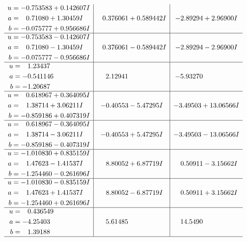 \documentclass[1p]{elsarticle_modified}
\theoremstyle{definition}
\begin{document}
$$\begin{array}{c|c|c}
\begin{aligned}
u &= -0.753583 + 0.142607 I \\
a &= \phantom{-}0.71080 + 1.30459 I \\
b &= -0.075777 + 0.956686 I\end{aligned}
 & \phantom{-}0.376061 + 0.589442 I & -2.89294 + 2.96900 I \\ \hline\begin{aligned}
u &= -0.753583 - 0.142607 I \\
a &= \phantom{-}0.71080 - 1.30459 I \\
b &= -0.075777 - 0.956686 I\end{aligned}
 & \phantom{-}0.376061 - 0.589442 I & -2.89294 - 2.96900 I \\ \hline\begin{aligned}
u &= \phantom{-}1.23437\phantom{ +0.000000I} \\
a &= -0.541146\phantom{ +0.000000I} \\
b &= -1.20687\phantom{ +0.000000I}\end{aligned}
 & \phantom{-}2.12941\phantom{ +0.000000I} & -5.93270\phantom{ +0.000000I} \\ \hline\begin{aligned}
u &= \phantom{-}0.618967 + 0.364095 I \\
a &= \phantom{-}1.38714 + 3.06211 I \\
b &= -0.859186 + 0.407319 I\end{aligned}
 & -0.40553 - 5.47295 I & -3.49503 + 13.06566 I \\ \hline\begin{aligned}
u &= \phantom{-}0.618967 - 0.364095 I \\
a &= \phantom{-}1.38714 - 3.06211 I \\
b &= -0.859186 - 0.407319 I\end{aligned}
 & -0.40553 + 5.47295 I & -3.49503 - 13.06566 I \\ \hline\begin{aligned}
u &= -1.010830 + 0.835159 I \\
a &= \phantom{-}1.47623 - 1.41537 I \\
b &= -1.254460 - 0.261696 I\end{aligned}
 & \phantom{-}8.80052 + 6.87719 I & \phantom{-}0.50911 - 3.15662 I \\ \hline\begin{aligned}
u &= -1.010830 - 0.835159 I \\
a &= \phantom{-}1.47623 + 1.41537 I \\
b &= -1.254460 + 0.261696 I\end{aligned}
 & \phantom{-}8.80052 - 6.87719 I & \phantom{-}0.50911 + 3.15662 I \\ \hline\begin{aligned}
u &= \phantom{-}0.436549\phantom{ +0.000000I} \\
a &= -4.25403\phantom{ +0.000000I} \\
b &= \phantom{-}1.39188\phantom{ +0.000000I}\end{aligned}
 & \phantom{-}5.61485\phantom{ +0.000000I} & \phantom{-}14.5490\phantom{ +0.000000I}\\
 \hline 
 \end{array}$$\newpage\newpage\renewcommand{\arraystretch}{1}
\end{document}
